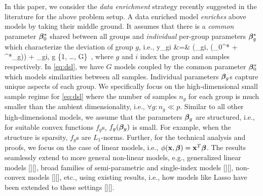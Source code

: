 In this paper, we consider the \emph{data enrichment} strategy recently suggested in the literature \cite{domu16, grti16,  olvi14, olvi15} for the above problem setup. 
 A data enriched model \emph{enriches} above models by taking their middle ground. It assumes that there is a \emph{common} parameter $\boldsymbol{\beta}^*_0$ shared between all groups and \emph{individual} per-group parameters $\boldsymbol{\beta}_g^*$ which characterize the deviation of group $g$, i.e.,
\be
\label{eq:dsl}
y_{gi} &=& \phi(\x_{gi}, (\bbeta_0^* + \bbeta^*_g)) + \omega_{gi}, \quad g \in \{1, \dots, G\}~,
\ee
where $g$ and $i$ index the group and samples respectively. In \eqref{eq:dsl}, we have $G$ 
models coupled by the common parameter $\boldsymbol{\beta}^*_0$ which models similarities between all samples. Individual parameters $\boldsymbol{\beta}_g$s capture unique aspects of each group.
We specifically focus on the high-dimensional small sample regime for \eqref{eq:dsl} where the number of samples $n_g$ for each group is much smaller than the ambient 
dimensionality, i.e., $\forall g: n_g \ll p$. Similar to all other high-dimensional models, we assume that the parameters $\boldsymbol{\beta}_g$ are structured, i.e., for suitable convex functions $f_g$s, $f_g(\boldsymbol{\beta}_g)$ is small.
For example, when the structure is sparsity, $f_g$s are $L_1$-norms. Further, for the technical analysis and proofs,
we focus on the case of linear models, i.e., $\phi(\mathbf{x},\boldsymbol{\beta}) = \mathbf{x}^T \boldsymbol{\beta}$. The results
seamlessly extend to more general non-linear models, e.g., generalized linear models [][], broad families of semi-parametric and single-index models [][], non-convex models [][], etc., using
existing results, i.e., how models like Lasso have been extended to these settings [][]. 



